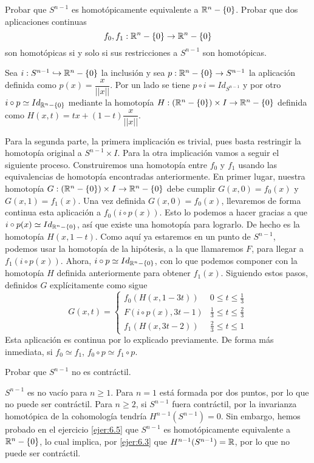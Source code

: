 \documentclass[twoside]{article}
\begin{document}
\begin{ejercicio}{6.5}
Probar que $S^{n-1}$ es homotópicamente equivalente a $\mathbb{R}^n-\{0\}$. Probar que dos aplicaciones continuas
\[
f_0,f_1:\mathbb{R}^n-\{0\}\to\mathbb{R}^n-\{0\}
\]
son homotópicas si y solo si sus restricciones a $S^{n-1}$ son homotópicas.
\end{ejercicio}
\begin{solucion}
Sea $i:S^{n-1}\hookrightarrow \mathbb{R}^n-\{0\}$ la inclusión y sea $p:\mathbb{R}^n-\{0\}\to S^{n-1}$ la aplicación definida como $p(x)=\dfrac{x}{||x||}$. Por un lado se tiene $p\circ i=Id_{S^{n-1}}$ y por otro $i\circ p\simeq Id_{\mathbb{R}^n-\{0\}}$ mediante la homotopía $H:(\mathbb{R}^n-\{0\})\times I\to \mathbb{R}^n-\{0\}$ definida como $H(x,t)=tx+(1-t)\dfrac{x}{||x||}$. 

Para la segunda parte, la primera implicación es trivial, pues basta restringir la homotopía original a $S^{n-1}\times I$. Para la otra implicación vamos a seguir el siguiente proceso. Construiremos una homotopía entre $f_0$ y $f_1$ usando las equivalencias de homotopía encontradas anteriormente. En primer lugar, nuestra homotopía $G:(\mathbb{R}^n-\{0\})\times I\to \mathbb{R}^n-\{0\}$ debe cumplir $G(x,0)=f_0(x)$ y $G(x,1)=f_1(x)$. Una vez definida $G(x,0)=f_0(x)$, llevaremos de forma continua esta aplicación a $f_0(i\circ p(x))$.  Esto lo podemos a hacer gracias a que $i\circ p(x)\simeq Id_{\mathbb{R}^n-\{0\}}$, así que existe una homotopía para lograrlo. De hecho es la homotopía $H(x,1-t)$. Como aquí ya estaremos en un punto de $S^{n-1}$, podemos usar la homotopía de la hipótesis, a la que llamaremos $F$, para llegar a $f_1(i\circ p(x))$. Ahora, $i\circ p \simeq Id_{\mathbb{R}^n-\{0\}}$, con lo que podemos componer con la homotopía $H$ definida anteriormente para obtener $f_1(x)$. Siguiendo estos pasos, definidos $G$ explícitamente como sigue
\[
G(x,t)=\begin{cases}
f_0(H(x,1-3t)) & 0\leq t\leq \frac{1}{3}\\
F(i\circ p(x), 3t-1) & \frac{1}{3}\leq t\leq\frac{2}{3}\\
f_1(H(x, 3t-2)) & \frac{2}{3}\leq t\leq 1
\end{cases}
\]
Esta aplicación es continua por lo explicado previamente. De forma más inmediata, si $f_0 \simeq f_1$, $f_0\circ p\simeq f_1\circ p$. 
\end{solucion}

\newpage

\begin{ejercicio}{6.6}
Probar que $S^{n-1}$ no es contráctil.
\end{ejercicio}
\begin{solucion}
$S^{n-1}$ es no vacío para $n\geq 1$. Para $n=1$ está formada por dos puntos, por lo que no puede ser contráctil. Para $n\geq 2$, si $S^{n-1}$ fuera contráctil, por la invarianza homotópica de la cohomología tendría $H^{n-1}(S^{n-1})=0$. Sin embargo, hemos probado en el ejercicio \ref{ejer:6.5} que $S^{n-1}$ es homotópicamente equivalente a $\mathbb{R}^n-\{0\}$, lo cual implica, por \ref{ejer:6.3} que $H^{n-1}(S^{n-1})=\mathbb{R}$, por lo que no puede ser contráctil. 
\end{solucion}
\end{document}
